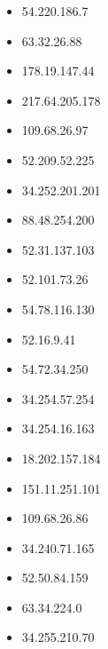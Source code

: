 \documentclass{article}
\begin{document}
\begin{itemize}
            \item 54.220.186.7
        
            \item 63.32.26.88
        
            \item 178.19.147.44
        
            \item 217.64.205.178
        
            \item 109.68.26.97
        
            \item 52.209.52.225
        
            \item 34.252.201.201
        
            \item 88.48.254.200
        
            \item 52.31.137.103
        
            \item 52.101.73.26
        
            \item 54.78.116.130
        
            \item 52.16.9.41
        
            \item 54.72.34.250
        
            \item 34.254.57.254
        
            \item 34.254.16.163
        
            \item 18.202.157.184
        
            \item 151.11.251.101
        
            \item 109.68.26.86
        
            \item 34.240.71.165
        
            \item 52.50.84.159
        
            \item 63.34.224.0
        
            \item 34.255.210.70
        

\end{itemize}
\end{document}
